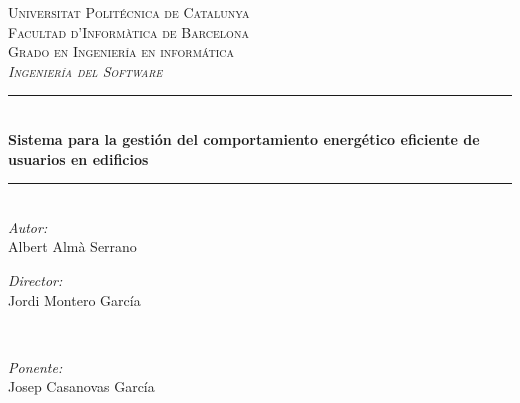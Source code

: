 \begin{titlepage}

\newcommand{\HRule}{\rule{\linewidth}{0.5mm}} %

\center %
 

\textsc{\LARGE Universitat Politécnica de Catalunya}\\[0.5cm]
\textsc{\Large Facultad d'Informàtica de Barcelona}\\[0.5cm]
\textsc{\large Grado en Ingeniería en informática}\\[0.5cm]
\textsc{\large \emph {Ingeniería del Software}}\\[0.5cm] 


\HRule \\[0.4cm]
{ \huge \bfseries Sistema para la gestión del comportamiento energético eficiente de usuarios en edificios}\\[0.4cm] %
\HRule \\[1.5cm]
 

\Large \emph{Autor:}\\
Albert Almà Serrano\\[3cm] %

\begin{minipage}{0.4\textwidth}
\begin{flushleft} \large
\emph{Director:}\\
Jordi Montero García
\end{flushleft}
\end{minipage}
~
\begin{minipage}{0.4\textwidth}
\begin{flushright} \large
\emph{Ponente:} \\
Josep Casanovas García 
\end{flushright}
\end{minipage}\\[4cm]


\end{titlepage}
